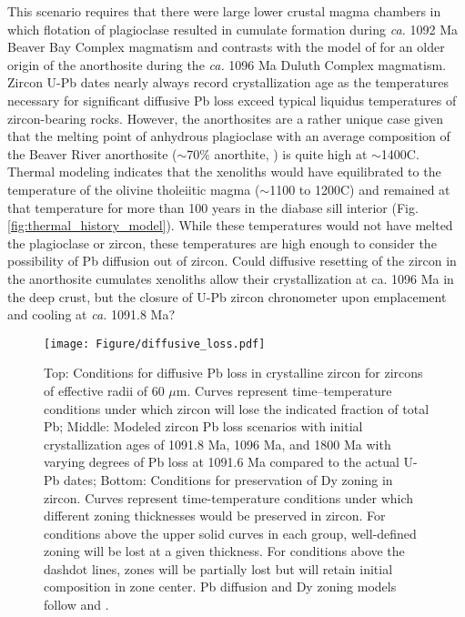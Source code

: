 This scenario requires that there were large lower crustal magma chambers in which flotation of plagioclase resulted in cumulate formation during \textit{ca.} 1092 Ma Beaver Bay Complex magmatism and contrasts with the model of  for an older origin of the anorthosite during the \textit{ca.} 1096 Ma Duluth Complex magmatism. Zircon U-Pb dates nearly always record crystallization age as the temperatures necessary for significant diffusive Pb loss exceed typical liquidus temperatures of zircon-bearing rocks. However, the anorthosites are a rather unique case given that the melting point of anhydrous plagioclase with an average composition of the Beaver River anorthosite ($\sim$70$\%$ anorthite, ) is quite high at $\sim$1400\textdegree C. Thermal modeling indicates that the xenoliths would have equilibrated to the temperature of the olivine tholeiitic magma ($\sim$1100 to 1200\textdegree C) and remained at that temperature for more than 100 years in the diabase sill interior (Fig. \ref{fig:thermal_history_model}). While these temperatures would not have melted the plagioclase or zircon, these temperatures are high enough to consider the possibility of Pb diffusion out of zircon. Could diffusive resetting of the zircon in the anorthosite cumulates xenoliths allow their crystallization at ca. 1096 Ma in the deep crust, but the closure of U-Pb zircon chronometer upon emplacement and cooling at \textit{ca.} 1091.8 Ma?

\begin{figure}[h!]
\noindent\texttt{[image: Figure/diffusive\_loss.pdf]}
\centering
\caption{\footnotesize{Top: Conditions for diffusive Pb loss in crystalline zircon for zircons of effective radii of 60 $\mu$m. Curves represent time–temperature conditions under which zircon will lose the indicated fraction of total Pb; Middle: Modeled zircon Pb loss scenarios with initial crystallization ages of 1091.8 Ma, 1096 Ma, and 1800 Ma with varying degrees of Pb loss at 1091.6 Ma compared to the actual U-Pb dates; Bottom: Conditions for preservation of Dy zoning in zircon. Curves represent time-temperature conditions under which different zoning thicknesses would be preserved in zircon. For conditions above the upper solid curves in each group, well-defined zoning will be lost at a given thickness. For conditions above the dashdot lines, zones will be partially lost but will retain initial composition in zone center. Pb diffusion and Dy zoning models follow  and .}}
\label{fig:diffusive_loss}
\end{figure}

